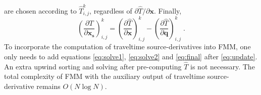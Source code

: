 are chosen according to $\hat{T}_{i,j}^k$, regardless of $\partial \hat{T} 
/ \partial \mathbf{x}$. Finally, 
\begin{equation}
\label{eq:final}
\left( \frac{\partial T}{\partial \mathbf{x_s}} \right)_{i,j}^k = 
\left( \frac{\partial \hat{T}}{\partial \mathbf{x}} \right)_{i,j}^k - 
\left( \frac{\partial \hat{T}}{\partial \mathbf{q}} \right)_{i,j}^k\;.
\end{equation}
To incorporate the computation of traveltime source-derivatives into 
FMM, one only needs to add equations \ref{eq:solve1}, \ref{eq:solve2} and 
\ref{eq:final} after \ref{eq:update}. An extra upwind sorting and 
solving after pre-computing $\hat{T}$ is not necessary. The total complexity of 
FMM with the auxiliary output of traveltime source-derivative remains $O(N \log N)$.


